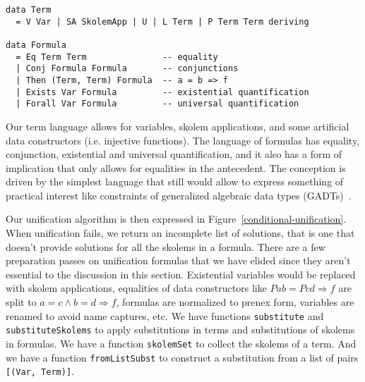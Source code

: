 \documentclass[sigconf, anonymous, review]{acmart}
\newcommand{\tc}[1]{{\small\texttt{#1}}}
\begin{document}
\begin{verbatim}
data Term
  = V Var | SA SkolemApp | U | L Term | P Term Term deriving

data Formula
  = Eq Term Term               -- equality
  | Conj Formula Formula       -- conjunctions
  | Then (Term, Term) Formula  -- a = b => f
  | Exists Var Formula         -- existential quantification
  | Forall Var Formula         -- universal quantification
\end{verbatim}

Our term language allows for variables, skolem applications, and some artificial
data constructors (i.e. injective functions). The language of formulas has
equality, conjunction, existential and universal quantification, and it also
has a form of implication that only allows for equalities in the antecedent.
The conception is driven by the simplest language that still would allow to
express something of practical interest like constraints of generalized
algebraic data types (GADTs)~\cite{schrijvers09}.

Our unification algorithm is then expressed in Figure~\ref{conditional-unification}.
When unification fails, we return an incomplete list of solutions, that is one that
doesn't provide solutions for all the skolems in a formula.
There are a few preparation passes on unification formulas that we have elided since
they aren't essential to the discussion in this section.
Existential variables would be replaced with skolem applications, equalities of
data constructors like $P a b = P c d \Rightarrow f$ are split to
$a = c \land b = d \Rightarrow f$, formulas are normalized to prenex form, variables
are renamed to avoid name captures, etc. We have functions \tc{substitute} and
\tc{substituteSkolems} to apply substitutions in terms and substitutions of skolems
in formulas. We have a function \tc{skolemSet} to collect the skolems of a
term. And we have a function \tc{fromListSubst} to construct a substitution from
a list of pairs \tc{[(Var, Term)]}.
\end{document}
